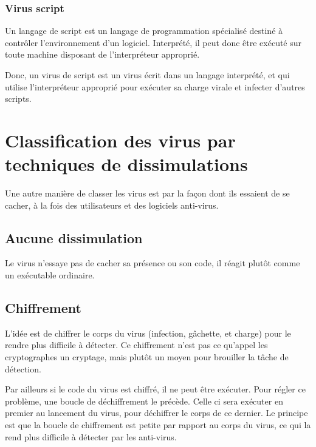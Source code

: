         \subsubsection{Virus script}
        Un langage de script est un langage de programmation spécialisé destiné à contrôler l'environnement 
        d'un logiciel. Interprété, il peut donc être exécuté sur toute machine disposant de l'interpréteur approprié. 
        \cite{virus_informatique_article} %

        Donc, un virus de script est un virus écrit dans un langage interprété, et qui utilise l'interpréteur approprié
        pour exécuter sa charge virale et infecter d'autres scripts. %

\section{Classification des virus par techniques de dissimulations}
Une autre manière de classer les virus est par la façon dont ils essaient de se cacher, 
à la fois des utilisateurs et des logiciels anti-virus. \cite{virus} %

    \subsection{Aucune dissimulation}
    Le virus n'essaye pas de cacher sa présence ou son code, il réagit plutôt comme un exécutable ordinaire. %

    \subsection{Chiffrement}
    L'idée est de chiffrer le corps du virus (infection, gâchette, et charge) pour le rendre plus difficile à 
    détecter. Ce chiffrement n'est pas ce qu'appel les cryptographes un cryptage, mais plutôt un moyen pour
    brouiller la tâche de détection. \cite{virus} %

    Par ailleurs si le code du virus est chiffré, il ne peut être exécuter. Pour régler ce problème, une boucle 
    de déchiffrement le précède. Celle ci sera exécuter en premier au lancement du virus, pour déchiffrer le 
    corps de ce dernier. Le principe est que la boucle de chiffrement est petite par rapport au corps du virus, 
    ce qui la rend plus difficile à détecter par les anti-virus. \cite{virus} %

